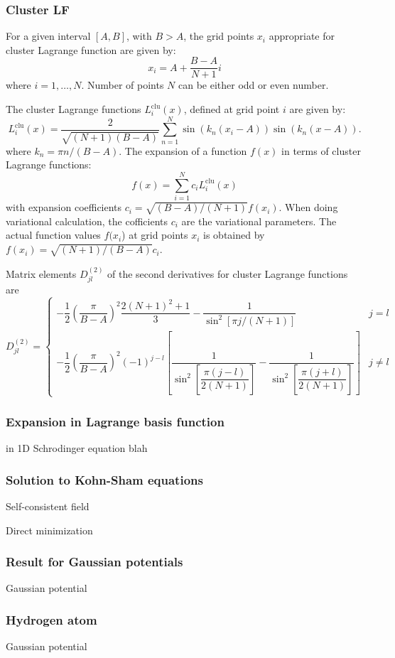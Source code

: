 \documentclass[8pt]{beamer}
\begin{document}
\begin{frame}
\frametitle{Cluster LF}

For a given interval $[A,B]$, with $B>A$, the grid points $x_{i}$
appropriate for cluster Lagrange function are given by:
\[
x_{i}=A+\frac{B-A}{N+1}i
\]
where $i=1,\ldots,N$. Number of points $N$ can be either odd or
even number.

The cluster Lagrange functions $L_{i}^{\mathrm{clu}}(x)$, defined
at grid point $i$ are given by:
\begin{equation}
L_{i}^{\mathrm{clu}}(x)=\frac{2}{\sqrt{(N+1)(B-A)}}\sum_{n=1}^{N}\sin\left(k_{n}(x_{i}-A)\right)\sin\left(k_{n}(x-A)\right).
\end{equation}
where $k_{n}=\pi n/(B-A)$. The expansion of a function $f(x)$ in
terms of cluster Lagrange functions:
\begin{equation}
f(x)=\sum_{i=1}^{N}c_{i}L_{i}^{\mathrm{clu}}(x)
\end{equation}
with expansion coefficients $c_{i}=\sqrt{(B-A)/(N+1)}f(x_{i})$. When
doing variational calculation, the cofficients $c_{i}$ are the variational
parameters. The actual function values $f(x_{i}$) at grid points
$x_{i}$ is obtained by $f(x_{i})=\sqrt{(N+1)/(B-A)}c_{i}$.

Matrix elements $D_{jl}^{(2)}$ of the second derivatives for cluster
Lagrange functions are
\begin{equation}
D_{jl}^{(2)}=\begin{cases}
-\dfrac{1}{2}\left(\dfrac{\pi}{B-A}\right)^{2}\dfrac{2(N+1)^{2}+1}{3}-\dfrac{1}{\sin^{2}\left[\pi j/(N+1)\right]} & j=l\\
-\dfrac{1}{2}\left(\dfrac{\pi}{B-A}\right)^{2}(-1)^{j-l}\left[\dfrac{1}{\sin^{2}\left[\dfrac{\pi(j-l)}{2(N+1)}\right]}-\dfrac{1}{\sin^{2}\left[\dfrac{\pi(j+l)}{2(N+1)}\right]}\right] & j\neq l
\end{cases}
\end{equation}

\end{frame}


\begin{frame}
\frametitle{Expansion in Lagrange basis function}

in 1D
Schrodinger equation
blah

\end{frame}


\begin{frame}
\frametitle{Solution to Kohn-Sham equations}

Self-consistent field

Direct minimization


\end{frame}

\begin{frame}
\frametitle{Result for Gaussian potentials}

Gaussian potential

\end{frame}

\begin{frame}
\frametitle{Hydrogen atom}

Gaussian potential

\end{frame}
\end{document}
